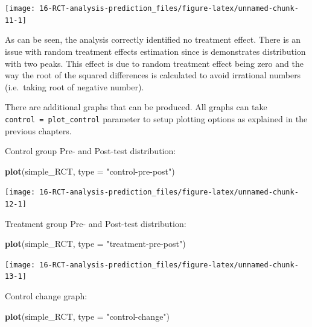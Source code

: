 \documentclass[
]{book}
\newenvironment{Shaded}{\begin{snugshade}}{\end{snugshade}}
\newcommand{\DataTypeTok}[1]{\textcolor[rgb]{0.13,0.29,0.53}{#1}}
\newcommand{\KeywordTok}[1]{\textcolor[rgb]{0.13,0.29,0.53}{\textbf{#1}}}
\newcommand{\NormalTok}[1]{#1}
\newcommand{\StringTok}[1]{\textcolor[rgb]{0.31,0.60,0.02}{#1}}
\begin{document}
\begin{center}\texttt{[image: 16-RCT-analysis-prediction\_files/figure-latex/unnamed-chunk-11-1]} \end{center}

As can be seen, the analysis correctly identified no treatment effect. There is an issue with random treatment effects estimation since is demonstrates distribution with two peaks. This effect is due to random treatment effect being zero and the way the root of the squared differences is calculated to avoid irrational numbers (i.e.~taking root of negative number).

There are additional graphs that can be produced. All graphs can take \texttt{control\ =\ plot\_control} parameter to setup plotting options as explained in the previous chapters.

Control group Pre- and Post-test distribution:

\begin{Shaded}
\begin{Highlighting}[]
\KeywordTok{plot}\NormalTok{(simple\_RCT, }\DataTypeTok{type =} \StringTok{"control{-}pre{-}post"}\NormalTok{)}
\end{Highlighting}
\end{Shaded}

\begin{center}\texttt{[image: 16-RCT-analysis-prediction\_files/figure-latex/unnamed-chunk-12-1]} \end{center}

Treatment group Pre- and Post-test distribution:

\begin{Shaded}
\begin{Highlighting}[]
\KeywordTok{plot}\NormalTok{(simple\_RCT, }\DataTypeTok{type =} \StringTok{"treatment{-}pre{-}post"}\NormalTok{)}
\end{Highlighting}
\end{Shaded}

\begin{center}\texttt{[image: 16-RCT-analysis-prediction\_files/figure-latex/unnamed-chunk-13-1]} \end{center}

Control change graph:

\begin{Shaded}
\begin{Highlighting}[]
\KeywordTok{plot}\NormalTok{(simple\_RCT, }\DataTypeTok{type =} \StringTok{"control{-}change"}\NormalTok{)}
\end{Highlighting}
\end{Shaded}
\end{document}
